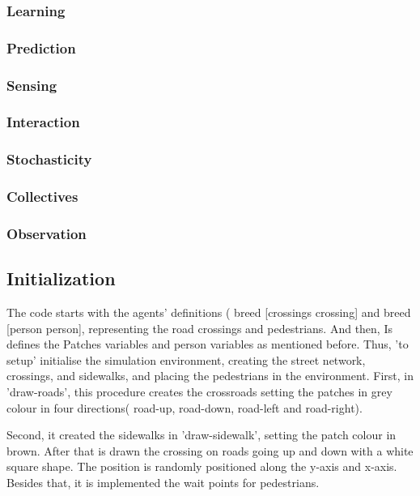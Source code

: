 \documentclass[10pt]{report}
\numberwithin{figure}{section}
\numberwithin{table}{section}
\begin{document}
\subsubsection{Learning}

\subsubsection{Prediction}

\subsubsection{Sensing}

\subsubsection{Interaction}

\subsubsection{Stochasticity}

\subsubsection{Collectives}

\subsubsection{Observation}

\subsection{Initialization}

The code starts with the agents' definitions ( breed [crossings crossing] and breed [person person], representing the road crossings and pedestrians. And then, Is defines the Patches variables and person variables as mentioned before. Thus, 'to setup' initialise the simulation environment, creating the street network, crossings, and sidewalks, and placing the pedestrians in the environment. First, in 'draw-roads', this procedure creates the crossroads setting the patches in grey colour in four directions( road-up, road-down, road-left and road-right). 

Second, it created the sidewalks in 'draw-sidewalk', setting the patch colour in brown. After that is drawn the crossing on roads going up and down with a white square shape. The position is randomly positioned along the y-axis and x-axis. Besides that, it is implemented the wait points for pedestrians.
\end{document}
